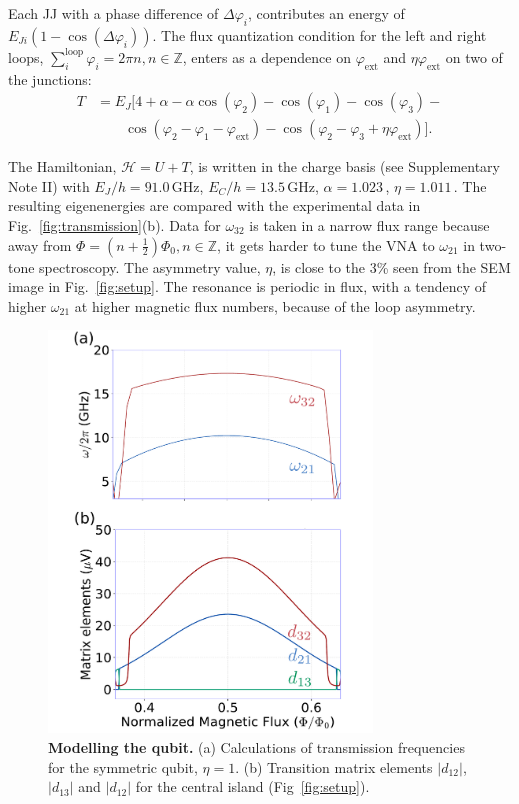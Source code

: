\documentclass[%
reprint,
superscriptaddress,
bibnotes,
amsmath,
amssymb,
aps,
showkeys,
prb,
]{revtex4-1}
\newcommand{\iunit}[2]{\ensuremath{#1\,\text{#2}}}
\begin{document}
Each  JJ  with  a  phase  difference  of  $\Delta\varphi_{i}$,  contributes  an  energy  of
$ E_{Ji}\left(1 - \cos(\Delta\varphi_i)\right) $.   The flux quantization condition for the
left                     and                    right                     loops,
$ \sum_{i}^{\text{loop}}  \varphi_i = 2\pi  n, n \in \mathbb{Z}$,  enters as a  dependence on
$ \varphi_\text{ext} $ and $ \eta\varphi_\text{ext} $ on two of the junctions:
\begin{equation}\label{eq:kinetic}
  \begin{aligned}
    T & = E_J\big[4 + \alpha - \alpha\cos(\varphi_{2}) -\cos(\varphi_{1}) -\cos(\varphi_{3}) - \\
    &  \qquad  \cos(\varphi_{2}   -  \varphi_{1}  -  \varphi_{\text{ext}})  -  \cos(\varphi_{2}   -  \varphi_{3}  +
    \eta\varphi_{\text{ext}})\big].
  \end{aligned}
\end{equation}

The  Hamiltonian, $\mathcal{H}= U + T$, is  written  in  the charge  basis (see Supplementary Note II)  with
\iunit{E_J/h = 91.0}{GHz}, \iunit{E_C/h = 13.5}{GHz}, \iunit{\alpha = 1.023}{}, \iunit{\eta
  = 1.011}{}. The resulting eigenenergies are compared with the experimental data in
Fig.~\ref{fig:transmission}(b).  Data for $ \omega_{32} $ is taken in a narrow flux range
because away from $ \Phi = (n + \frac{1}{2}) \Phi_0, n\in\mathbb{Z} $, it gets harder to tune the VNA to
$ \omega_{21} $  in two-tone spectroscopy.  The  asymmetry value, $ \eta $,  is close to
the  3\%  seen  from  the   SEM  image  in
Fig.~\ref{fig:setup}.  The  resonance is  periodic in flux,  with a  tendency of
higher $\omega_{21}$ at higher magnetic flux numbers, because of the loop asymmetry.

\begin{figure}
  \includegraphics[width=86mm]{fig3}
  \caption{\small \textbf{Modelling the qubit.} 
    (a) Calculations of transmission frequencies for the symmetric qubit,
    $\eta=1$. (b) Transition matrix elements $|d_{12}|$, $|d_{13}|$ and $|d_{12}|$ for the central island (Fig~\ref{fig:setup}). 
  \label{fig:simulations}}
\end{figure}
\end{document}
